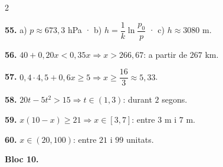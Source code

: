 \documentclass[13pt,a4paper]{extarticle}
\begin{document}
\begin{multicols}{2}
\begin{minipage}{\linewidth}
\end{minipage}\par\vspace{1.6mm}
\par\noindent\begin{minipage}{\linewidth}
\textbf{55.} a) $p\approx 673{,}3$ hPa · b) $h=\dfrac{1}{k}\ln\dfrac{p_0}{p}$ · c) $h\approx 3080$ m.\par
\end{minipage}\par\vspace{1.6mm}
\par\noindent\begin{minipage}{\linewidth}
\textbf{56.} $40+0{,}20x<0{,}35x \Rightarrow x>266{,}67$: a partir de $267$ km.\par
\end{minipage}\par\vspace{1.6mm}
\par\noindent\begin{minipage}{\linewidth}
\textbf{57.} $0{,}4\cdot 4{,}5+0{,}6x\geq 5 \Rightarrow x\geq\dfrac{16}{3}\approx 5{,}33$.\par
\end{minipage}\par\vspace{1.6mm}
\par\noindent\begin{minipage}{\linewidth}
\textbf{58.} $20t-5t^2>15 \Rightarrow t\in(1,3)$: durant $2$ segons.\par
\end{minipage}\par\vspace{1.6mm}
\par\noindent\begin{minipage}{\linewidth}
\textbf{59.} $x(10-x)\geq 21 \Rightarrow x\in[3,7]$: entre $3$ m i $7$ m.\par
\end{minipage}\par\vspace{1.6mm}
\par\noindent\begin{minipage}{\linewidth}
\textbf{60.} $x\in(20,100)$: entre $21$ i $99$ unitats.\par
\end{minipage}\par\vspace{1.6mm}
\textbf{Bloc 10.}\par

\end{multicols}
\end{document}
